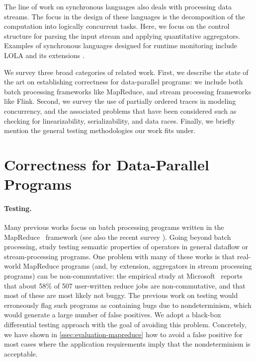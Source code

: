 The line of work on synchronous languages \cite{BCEHlGdS2003SL} also deals with processing data streams. The focus in the design of these languages is the decomposition of the computation into logically concurrent tasks. Here, we focus on the control structure for parsing the input stream and applying quantitative aggregators.
Examples of synchronous languages designed for runtime monitoring include LOLA \cite{d2005lola} and its
extensions \cite{bozzelli2016foundations}.


We survey three broad categories of related work. First, we describe the state of the art on establishing correctness for data-parallel programs: we include both batch processing frameworks like MapReduce, and stream processing frameworks like Flink.
Second, we survey the use of partially ordered traces in modeling concurrency, and the associated problems that have been considered such as checking for linearizability, serializability, and data races.
Finally, we briefly mention the general testing methodologies our work fits under.

\section{Correctness for Data-Parallel Programs}

\paragraph{Testing.}
Many previous works focus on batch processing programs written in the MapReduce~\cite{MapReduce2008} framework \cite{csallner2011new,xu2013semantic,marynowski2012testing,chen2016commutativity} (see also the recent survey \cite{moran2019testing}). Going beyond batch processing, \cite{xu2013testing} study testing semantic properties of operators in general dataflow or stream-processing programs.
One problem with many of these works \cite{csallner2011new,xu2013semantic,xu2013testing,chen2016commutativity} is that real-world MapReduce programs (and, by extension, aggregators in stream processing programs) can be non-commutative: the empirical study at Microsoft~\cite{xiao2014nondeterminism} reports that about 58\% of 507 user-written reduce jobs are non-commutative, and that most of these are most likely not buggy. The previous work on testing would erroneously flag such programs as containing bugs due to nondeterminism, which would generate a large number of false positives. We adopt a black-box differential testing approach with the goal of avoiding this problem. Concretely, we have shown in \cref{ssec:evaluation-mapreduce} how to avoid a false positive for most cases where the application requirements imply that the nondeterminism is acceptable.

